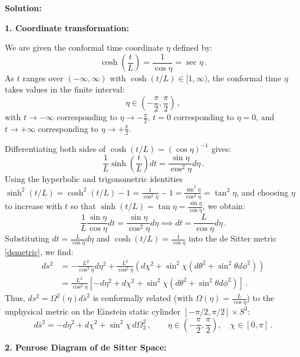 \documentclass[12pt]{article}
\newcommand{\be}{\begin{equation}}
\newcommand{\ee}{\end{equation}}
\begin{document}
\begin{enumerate}[label=\alph*)]
\medskip
\noindent\textbf{Solution:}

\noindent\textbf{1. Coordinate transformation:}

We are given the conformal time coordinate $\eta$ defined by:
\be
\cosh\left(\frac{t}{L}\right) = \frac{1}{\cos\eta} = \sec\eta \,.
\ee
As $t$ ranges over $(-\infty, \infty)$ with $\cosh(t/L) \in [1, \infty)$, the conformal time $\eta$ takes values in the finite interval:
\be
\eta \in \left(-\frac{\pi}{2}, \frac{\pi}{2}\right) \,,
\ee
with $t \to -\infty$ corresponding to $\eta \to -\frac{\pi}{2}$, $t = 0$ corresponding to $\eta = 0$, and $t \to +\infty$ corresponding to $\eta \to +\frac{\pi}{2}$.

Differentiating both sides of $\cosh(t/L) = (\cos\eta)^{-1}$ gives:
\be
\frac{1}{L} \sinh\left(\frac{t}{L}\right) dt = \frac{\sin\eta}{\cos^2\eta} d\eta \,.
\ee
Using the hyperbolic and trigonometric identities $\sinh^2(t/L) = \cosh^2(t/L) - 1 = \frac{1}{\cos^2\eta} - 1 = \frac{\sin^2\eta}{\cos^2\eta} = \tan^2\eta$, and choosing $\eta$ to increase with $t$ so that $\sinh(t/L) = \tan\eta = \frac{\sin\eta}{\cos\eta}$, we obtain:
\be
\frac{1}{L} \frac{\sin\eta}{\cos\eta} dt = \frac{\sin\eta}{\cos^2\eta} d\eta \implies dt = \frac{L}{\cos\eta} d\eta \,.
\ee
Substituting $dt = \frac{L}{\cos\eta} d\eta$ and $\cosh(t/L) = \frac{1}{\cos\eta}$ into the de Sitter metric \eqref{dsmetric}, we find:
\begin{align}
ds^2 &= -\frac{L^2}{\cos^2\eta} d\eta^2 + \frac{L^2}{\cos^2\eta} \left( d\chi^2 + \sin^2\chi \left( d\theta^2 + \sin^2\theta d\phi^2 \right) \right) \nonumber\\
&= \frac{L^2}{\cos^2\eta} \left[ -d\eta^2 + d\chi^2 + \sin^2\chi \left( d\theta^2 + \sin^2\theta d\phi^2 \right) \right] \,.
\end{align}
Thus, $ds^2 = \Omega^2(\eta) d\bar{s}^2$ is conformally related (with $\Omega(\eta) = \frac{L}{\cos\eta}$) to the unphysical metric on the Einstein static cylinder $[-{\pi}/{2}, {\pi}/{2}] \times S^3$:
\be
d\bar{s}^2 = -d\eta^2 + d\chi^2 + \sin^2\chi \, d\Omega_2^2 \,, \qquad \eta \in \left(-\frac{\pi}{2}, \frac{\pi}{2}\right), \quad \chi \in [0, \pi] \,.
\ee

\noindent\textbf{2. Penrose Diagram of de Sitter Space:}


\end{enumerate}
\end{document}
